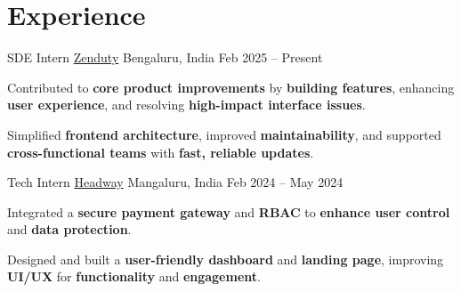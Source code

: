 \section*{Experience}

\experience
  {SDE Intern}
  {\href{https://www.zenduty.com/}{Zenduty}}
  {Bengaluru, India}
  {Feb 2025 -- Present}
  {
    \item Contributed to \textbf{core product improvements} by \textbf{building features}, enhancing \textbf{user experience}, and resolving \textbf{high-impact interface issues}.
    \item Simplified \textbf{frontend architecture}, improved \textbf{maintainability}, and supported \textbf{cross-functional teams} with \textbf{fast, reliable updates}.
  }

\experience
  {Tech Intern}
  {\href{https://headway.co.in/}{Headway}}
  {Mangaluru, India}
  {Feb 2024 -- May 2024}
  {
    \item Integrated a \textbf{secure payment gateway} and \textbf{RBAC} to \textbf{enhance user control} and \textbf{data protection}.
    \item Designed and built a \textbf{user-friendly dashboard} and \textbf{landing page}, improving \textbf{UI/UX} for \textbf{functionality} and \textbf{engagement}.
  }
